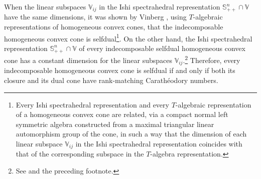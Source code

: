 \documentclass[oneside]{amsart}
\theoremstyle{plain}
\theoremstyle{definition}
\theoremstyle{remark}
\numberwithin{equation}{section}
\begin{document}
When the linear subspaces $\mathbb{V}_{ij}$ in the Ishi spectrahedral
representation $\mathbb{S}^{n}_{++} \cap \mathbb{V}$ have the same
dimensions, it was shown by Vinberg \cite[Proposition~II.2.3]{Vin65}, using
$T$-algebraic representations of homogeneous convex cones, that the
indecomposable homogeneous convex cone is selfdual\footnote{Every Ishi
spectrahedral representation and every $T$-algebraic representation of a
homogeneous convex cone are related, via a compact normal left symmetric
algebra constructed from a maximal triangular linear automorphism group of
the cone, in such a way that the dimension of each linear subspace
$\mathbb{V}_{ij}$ in the Ishi spectrahedral representation coincides with
that of the corresponding subspace in the $T$-algebra representation.}. On
the other hand, the Ishi spectrahedral representation $\mathbb{S}^{n}_{++}
\cap \mathbb{V}$ of every indecomposable selfdual homogeneous convex cone
has a constant dimension for the linear subspaces
$\mathbb{V}_{ij}$.\footnote{See \cite[\S{II}.2]{Vin65} and the preceding
footnote.} Therefore, every indecomposable homogeneous convex cone is
selfdual if and only if both its closure and its dual cone have
rank-matching Carath\'eodory numbers.
\end{document}
